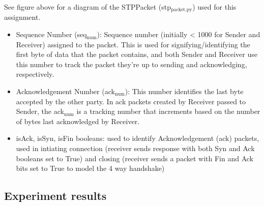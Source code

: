 \documentclass[11pt]{article}
\begin{document}
 See figure above for a diagram of the STPPacket (stp\(_{\text{packet.py}}\)) used for this assignment.
\begin{itemize}
\item Sequence Number (seq\(_{\text{num}}\)): Sequence number (initially < 1000 for Sender and Receiver) assigned to the packet. This is used for signifying/identifying the first byte of data that the packet contains, and both Sender and Receiver use this number to track the packet they're up to sending and acknowledging, respectively.
\item Acknowledgement Number (ack\(_{\text{num}}\)): This number identifies the last byte accepted by the other party. In ack packets created by Receiver passed to Sender, the ack\(_{\text{num}}\) is a tracking number that increments based on the number of bytes last acknowledged by Receiver.
\item isAck, isSyn, isFin booleans: used to identify Acknowledgement (ack) packets, used in intiating connection (receiver sends response with both Syn and Ack booleans set to True) and closing (receiver sends a packet with Fin and Ack bits set to True to model the 4 way handshake)
\end{itemize}
\subsection{Experiment results}
\label{sec:orge7704f0}
\end{document}
